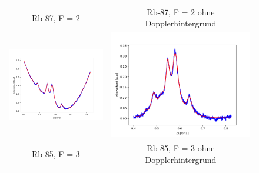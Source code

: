 \documentclass[a4paper,parskip]{scrartcl}
\begin{document}
\begin{figure}[p]
\begin{tabular}{cc}
    {\footnotesize Rb-87, F = 2} & {\footnotesize Rb-87, F = 2 ohne Dopplerhintergrund}  \\
    \includegraphics[scale = 0.45]{./saturation/peak2/fit.png}  &  \includegraphics[scale = 0.45]{./saturation/peak2/gaussCorrected.png}  \\
    {\footnotesize Rb-85, F = 3} & {\footnotesize Rb-85, F = 3 ohne Dopplerhintergrund}  \\

\end{tabular}
\end{figure}
\end{document}

